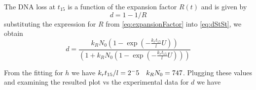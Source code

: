 \documentclass[12pt]{report}
\begin{document}
The DNA loss at $t_{15}$ is a function of the expansion factor $R(t)$ and is given by 
\begin{equation}\label{eq:dStSt}
d= 1-1/R 
\end{equation}
substituting the expression for $R$ from \ref{eq:expansionFactor} into \ref{eq:dStSt}, we obtain 
\begin{equation}
d =  \frac{k_RN_0(1-\exp(-\frac{k_rt_{15}}{l}U))}{(1+k_RN_0(1-\exp(-\frac{k_rt_{15}}{l}U)))}
\end{equation}

From the fitting for $h$ we have $k_rt_{15}/l = 2\time10^-5 \quad k_RN_0 = 747$. Plugging these values and examining the resulted plot vs the experimental data for $d$ we have 
\end{document}
